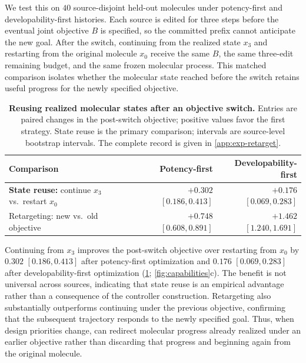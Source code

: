 We test this on $40$ source-disjoint held-out molecules under potency-first and developability-first histories. Each source is edited for three steps before the eventual joint objective $B$ is specified, so the committed prefix cannot anticipate the new goal. After the switch, continuing from the realized state $x_3$ and restarting from the original molecule $x_0$ receive the same $B$, the same three-edit remaining budget, and the same frozen molecular process. This matched comparison isolates whether the molecular state reached before the switch retains useful progress for the newly specified objective.

\begin{table}[!ht]
\centering
{\small
\begin{tabular}{lrr}
\toprule
Comparison & Potency-first & Developability-first \\
\midrule
\textbf{State reuse:} continue $x_3$ vs.\ restart $x_0$ & \textbf{$+0.302$} $[0.186,0.413]$ & \textbf{$+0.176$} $[0.069,0.283]$ \\
Retargeting: new vs.\ old objective & $+0.748$ $[0.608,0.891]$ & $+1.462$ $[1.240,1.691]$ \\
\bottomrule
\end{tabular}}
\caption{\small\textbf{Reusing realized molecular states after an objective switch.} Entries are paired changes in the post-switch objective; positive values favor the first strategy. State reuse is the primary comparison; intervals are source-level bootstrap intervals. The complete record is given in \cref{app:exp-retarget}.}
\label{tab:retarget}
\end{table}

Continuing from $x_3$ improves the post-switch objective over restarting from $x_0$ by $0.302$ $[0.186,0.413]$ after potency-first optimization and $0.176$ $[0.069,0.283]$ after developability-first optimization (\cref{tab:retarget}; \cref{fig:capabilities}c). The benefit is not universal across sources, indicating that state reuse is an empirical advantage rather than a consequence of the controller construction. Retargeting also substantially outperforms continuing under the previous objective, confirming that the subsequent trajectory responds to the newly specified goal. Thus, when design priorities change, \method{} can redirect molecular progress already realized under an earlier objective rather than discarding that progress and beginning again from the original molecule.

